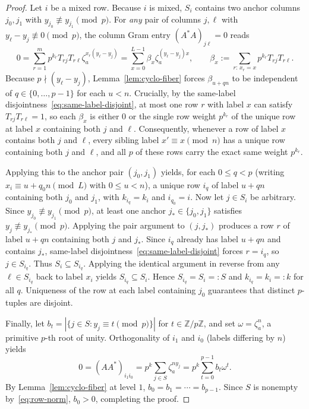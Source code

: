 \documentclass[11pt,reqno]{amsart}
\numberwithin{equation}{section}
\theoremstyle{definition}
\theoremstyle{remark}
\newcommand{\Z}{\mathbb{Z}}
\begin{document}
\begin{proof}
Let $i$ be a mixed row. Because $i$ is mixed, $S_i$ contains two anchor columns $j_0,j_1$ with $y_{j_0}\not\equiv y_{j_1}\pmod p$. For \emph{any} pair of columns $j,\ell$ with $y_\ell - y_j \not\equiv 0\pmod p$, the column Gram entry $(A^*A)_{j\ell}=0$ reads
\[
0 = \sum_{r=1}^m p^{k_r} T_{rj}T_{r\ell}\zeta_a^{x_r(y_\ell - y_j)}
= \sum_{x=0}^{L-1} \beta_x \zeta_a^{(y_\ell - y_j)x},
\qquad \beta_x := \sum_{r:\,x_r=x} p^{k_r} T_{rj}T_{r\ell}.
\]
Because $p\nmid (y_\ell-y_j)$, Lemma~\ref{lem:cyclo-fiber} forces $\beta_{u+qn}$ to be independent of $q\in\{0,\ldots,p-1\}$ for each $u<n$. Crucially, by the same-label disjointness~\eqref{eq:same-label-disjoint}, at most one row $r$ with label $x$ can satisfy $T_{rj}T_{r\ell}=1$, so each $\beta_x$ is either $0$ or the single row weight $p^{k_r}$ of the unique row at label $x$ containing both $j$ and $\ell$. Consequently, whenever a row of label $x$ contains both $j$ and $\ell$, every sibling label $x'\equiv x\pmod n$ has a unique row containing both $j$ and $\ell$, and all $p$ of these rows carry the exact same weight $p^{k_r}$.

Applying this to the anchor pair $(j_0,j_1)$ yields, for each $0\le q<p$ (writing $x_i\equiv u+q_0 n\pmod L$ with $0\le u<n$), a unique row $i_q$ of label $u+qn$ containing both $j_0$ and $j_1$, with $k_{i_q}=k_i$ and $i_{q_0}=i$. Now let $j\in S_i$ be arbitrary. Since $y_{j_0}\not\equiv y_{j_1}\pmod p$, at least one anchor $j_*\in\{j_0,j_1\}$ satisfies $y_j\not\equiv y_{j_*}\pmod p$. Applying the pair argument to $(j,j_*)$ produces a row $r$ of label $u+qn$ containing both $j$ and $j_*$. Since $i_q$ already has label $u+qn$ and contains $j_*$, same-label disjointness~\eqref{eq:same-label-disjoint} forces $r=i_q$, so $j\in S_{i_q}$. Thus $S_i\subseteq S_{i_q}$. Applying the identical argument in reverse from any $\ell\in S_{i_q}$ back to label $x_i$ yields $S_{i_q}\subseteq S_i$. Hence $S_{i_q}=S_i=:S$ and $k_{i_q}=k_i=:k$ for all $q$. Uniqueness of the row at each label containing $j_0$ guarantees that distinct $p$-tuples are disjoint.

Finally, let $b_t=|\{j\in S : y_j\equiv t\pmod p\}|$ for $t\in\Z/p\Z$, and set $\omega=\zeta_a^n$, a primitive $p$-th root of unity. Orthogonality of $i_1$ and $i_0$ (labels differing by $n$) yields
\[
0 = (AA^*)_{i_1 i_0} = p^k\sum_{j\in S}\zeta_a^{ny_j} = p^k\sum_{t=0}^{p-1} b_t \omega^t.
\]
By Lemma~\ref{lem:cyclo-fiber} at level $1$, $b_0=b_1=\cdots=b_{p-1}$. Since $S$ is nonempty by~\eqref{eq:row-norm}, $b_0>0$, completing the proof.
\end{proof}
\end{document}
